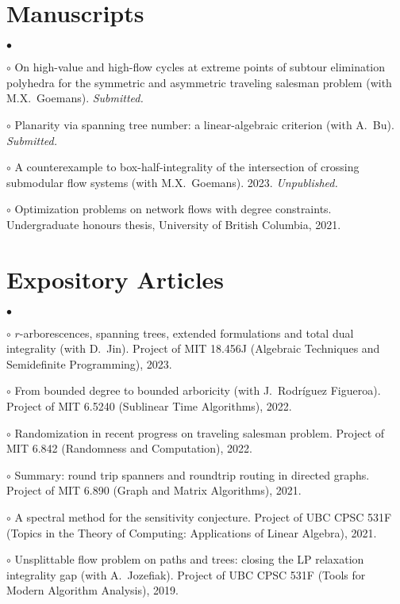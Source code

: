 \documentclass[margin,line]{res}
\newenvironment{list2}{
  \begin{list}{$\bullet$}{%
      \setlength{\itemsep}{0in}
      \setlength{\parsep}{0in} \setlength{\parskip}{0in}
      \setlength{\topsep}{0in} \setlength{\partopsep}{0in}
      \setlength{\leftmargin}{0.2in}}}{\end{list}}
\begin{document}
\begin{resume}
\section{\sc Manuscripts}

\begin{list2}
  \item[$\circ$] On high-value and high-flow cycles at extreme points of subtour elimination polyhedra for the symmetric and asymmetric traveling salesman problem (with M.X.\ Goemans). \emph{Submitted.}
  \item[$\circ$] Planarity via spanning tree number: a linear-algebraic criterion (with A.\ Bu). \emph{Submitted.}
  \item[$\circ$] A counterexample to box-half-integrality of the intersection of crossing submodular flow systems (with M.X.\ Goemans). 2023. \emph{Unpublished.}
  \item[$\circ$] Optimization problems on network flows with degree constraints. Undergraduate honours thesis, University of British Columbia, 2021. %
\end{list2}


\section{\sc Expository Articles}

\begin{list2}
\item[$\circ$] $r$-arborescences, spanning trees, extended formulations and total dual integrality (with D.\ Jin). Project of MIT 18.456J (Algebraic Techniques and Semidefinite Programming), 2023.
\item[$\circ$] From bounded degree to bounded arboricity (with J.\ Rodríguez Figueroa). Project of MIT 6.5240 (Sublinear Time Algorithms), 2022.
\item[$\circ$] Randomization in recent progress on traveling salesman problem. Project of MIT 6.842 (Randomness and Computation), 2022.
\item[$\circ$] Summary: round trip spanners and roundtrip routing in directed graphs. Project of MIT 6.890 (Graph and Matrix Algorithms), 2021.
\item[$\circ$] A spectral method for the sensitivity conjecture. Project of UBC CPSC 531F (Topics in the Theory of Computing: Applications of Linear Algebra), 2021.
\item[$\circ$] Unsplittable flow problem on paths and trees: closing the LP relaxation integrality gap (with A.\ Jozefiak). Project of UBC CPSC 531F (Tools for Modern Algorithm Analysis), 2019. %
\end{list2}


\end{resume}
\end{document}
